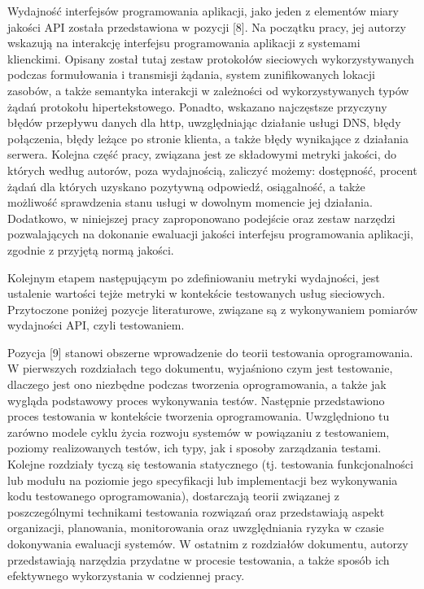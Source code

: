 Wydajność interfejsów programowania aplikacji, jako jeden z elementów miary jakości API została przedstawiona w pozycji [8]. Na początku pracy, jej autorzy wskazują na interakcję interfejsu programowania aplikacji z systemami klienckimi. Opisany został tutaj zestaw protokołów sieciowych wykorzystywanych podczas formułowania i transmisji żądania, system zunifikowanych lokacji zasobów, a także semantyka interakcji w zależności od wykorzystywanych typów żądań protokołu hipertekstowego. Ponadto, wskazano najczęstsze przyczyny błędów przepływu danych dla http, uwzględniając działanie usługi DNS, błędy połączenia, błędy leżące po stronie klienta, a także błędy wynikające z działania serwera. Kolejna część pracy, związana jest ze składowymi metryki jakości, do których według autorów, poza wydajnością, zaliczyć możemy: dostępność, procent żądań dla których uzyskano pozytywną odpowiedź, osiągalność, a także możliwość sprawdzenia stanu usługi w dowolnym momencie jej działania. Dodatkowo, w niniejszej pracy zaproponowano podejście oraz zestaw narzędzi pozwalających na dokonanie ewaluacji jakości interfejsu programowania aplikacji, zgodnie z przyjętą normą jakości.

Kolejnym etapem następującym po zdefiniowaniu metryki wydajności, jest ustalenie wartości tejże metryki w kontekście testowanych usług sieciowych. Przytoczone poniżej pozycje literaturowe, związane są z wykonywaniem pomiarów wydajności API, czyli testowaniem.

Pozycja [9] stanowi obszerne wprowadzenie do teorii testowania oprogramowania. W pierwszych rozdziałach tego dokumentu, wyjaśniono czym jest testowanie, dlaczego jest ono niezbędne podczas tworzenia oprogramowania, a także jak wygląda podstawowy proces wykonywania testów. Następnie przedstawiono proces testowania w kontekście tworzenia oprogramowania. Uwzględniono tu zarówno modele cyklu życia rozwoju systemów w powiązaniu z testowaniem, poziomy realizowanych testów, ich typy, jak i sposoby zarządzania testami. Kolejne rozdziały tyczą się testowania statycznego (tj. testowania funkcjonalności lub modułu na poziomie jego specyfikacji lub implementacji bez wykonywania kodu testowanego oprogramowania), dostarczają teorii związanej z poszczególnymi technikami testowania rozwiązań oraz przedstawiają aspekt organizacji, planowania, monitorowania oraz uwzględniania ryzyka w czasie dokonywania ewaluacji systemów. W ostatnim z rozdziałów dokumentu, autorzy przedstawiają narzędzia przydatne w procesie testowania, a także sposób ich efektywnego wykorzystania w codziennej pracy.

